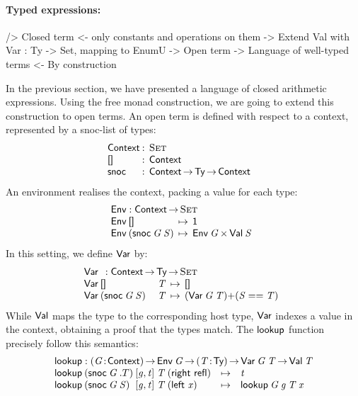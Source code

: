 \paragraph{Typed expressions:}

\begin{wstructure}
    /> Closed term
        <- only constants and operations on them
        -> Extend Val with Var : Ty -> Set, mapping to EnumU
            -> Open term
            -> Language of well-typed terms
                <- By construction
\end{wstructure}

\newcommand{\Ctxt}{\D{Context}}
\newcommand{\SYMBCtxtEmpty}{\C{[]}\xspace}
\newcommand{\CtxtEmpty}{\SYMBCtxtEmpty}
\newcommand{\SYMBCtxtSnoc}{\C{snoc}\xspace}
\newcommand{\CtxtSnoc}[2]{\SYMBCtxtSnoc\:#1\:#2}
\newcommand{\SYMBEnv}{\F{Env}}
\newcommand{\Env}[1]{\SYMBEnv\: #1}
\newcommand{\SYMBlookup}{\F{lookup}}
\newcommand{\lookup}[4]{\SYMBlookup\: #1\: #2\: #3\: #4}

In the previous section, we have presented a language of closed
arithmetic expressions. Using the free monad construction, we are
going to extend this construction to open terms. An open term is
defined with respect to a context, represented by a snoc-list of
types:
%
\[
\begin{array}{@{}l@{\::\:\:}l@{\quad}l}
\Ctxt           & \Set \\
\SYMBCtxtEmpty  & \Ctxt \\
\SYMBCtxtSnoc   & \Ctxt \To \Ty \To \Ctxt
\end{array}
\]
%
An environment realises the context, packing a value for each type:
%
\[
\stk{
\SYMBEnv : \Ctxt \To \Set \\
\begin{array}{@{}l@{\:\:\mapsto\:\:}l}
\Env{\CtxtEmpty}                & \Unit \\
\Env{(\CtxtSnoc{\V{G}}{\V{S}})} & \TIMES{\Env{\V{G}}}{\Val{\V{S}}}
\end{array}
}\]
%
In this setting, we define $\SYMBVar$ by:
%
\[\stk{
\Var{}{} : \Ctxt \To \Ty \To \Set \\
\begin{array}{@{}ll@{\:\:\mapsto\:\:}l}
\Var{\CtxtEmpty}{& \V{T}}                & 
    \Void \\
\Var{(\CtxtSnoc{\V{G}}{\V{S}})}{& \V{T}} & 
    \SUM{(\Var{\V{G}}{\V{T}})}{(\V{S} \PropEq \V{T})}
\end{array}
}\]
%
While $\SYMBVal$ maps the type to the corresponding host type,
$\SYMBVar$ indexes a value in the context, obtaining a proof that the
types match. The $\SYMBlookup$ function precisely follow this
semantics:
%
\[\stk{
\SYMBlookup : \PI{\V{G}}{\Ctxt} 
          \Env{\V{G}} \To 
          \PI{\V{T}}{\Ty} 
          \Var{\V{G}}{\V{T}} \To
          \Val{\V{T}} \\
\begin{array}{@{}l@{}l@{}l@{}l@{}lll}
\lookup{& (\CtxtSnoc{\V{G}}{.T})}{& \pair{\V{g}}{\V{t}}{}}{& \V{T}}{& (\SumRight{\C{refl}})} & \mapsto & \V{t} \\
\lookup{& (\CtxtSnoc{\V{G}}{\V{S}})}{& \pair{\V{g}}{\V{t}}{}}{& \V{T}}{& (\SumLeft{\V{x}})} & \mapsto & \lookup{\V{G}}{\V{g}}{\V{T}}{\V{x}} 
\end{array}
}\]

